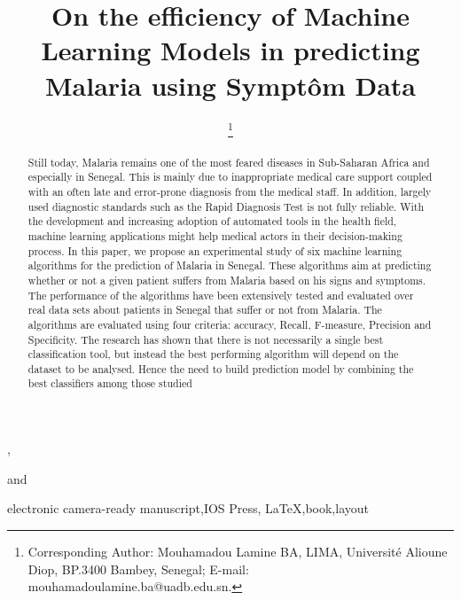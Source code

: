 \documentclass{IOS-Book-Article}
\def\hb{\hbox to 10.7 cm{}}
\def\hb{\hbox to 10.7 cm{}}
\begin{document}
\pagestyle{headings}
\def\thepage{}

\begin{frontmatter}              %

\title{On the efficiency of Machine Learning Models in predicting Malaria using Sympt\^om Data}

\markboth{}{January 2020\hb}

\author{ },
\author{ 
\thanks{Corresponding Author: Mouhamadou Lamine BA, LIMA, Universit\'e Alioune Diop,
BP.3400 Bambey, Senegal; E-mail: mouhamadoulamine.ba@uadb.edu.sn.}}
and
\author{ }

\address{LIMA, Universit\'e Alioune Diop, Bambey, Senegal}

\begin{abstract}
Still today, Malaria remains one of the most feared diseases in Sub-Saharan Africa and especially in Senegal. This is mainly due to inappropriate medical care support coupled with an often late and error-prone diagnosis from the medical staff. In addition, largely used diagnostic standards such as the Rapid Diagnosis Test is not fully reliable. With the development and increasing adoption of automated tools in the health field, machine learning applications might help medical actors in their decision-making process. In this paper, we propose an experimental study of six machine learning algorithms for the prediction of Malaria in Senegal. These algorithms aim at predicting whether or not a given patient suffers from Malaria based on his signs and symptoms. The performance of the algorithms have been extensively tested and evaluated over real data sets about patients in Senegal that suffer or not from Malaria. The algorithms are evaluated using four criteria: accuracy, Recall, F-measure, Precision and Specificity. The research has shown that there is not necessarily a single best classification tool, but instead the best performing algorithm will depend on the dataset to be analysed.
Hence the need to build prediction model  by combining the best classifiers among those studied
\end{abstract}

\begin{keyword}
electronic camera-ready manuscript\sep IOS Press\sep
\LaTeX\sep book\sep layout
\end{keyword}
\end{frontmatter}
\markboth{January 2020\hb}{January 2020\hb}














\end{document}
